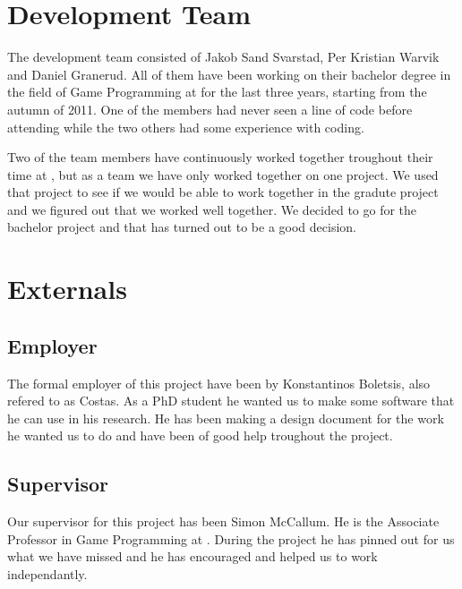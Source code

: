 \section{Development Team}
The development team consisted of Jakob Sand Svarstad, Per Kristian Warvik and Daniel Granerud.
All of them have been working on their bachelor degree in the field of Game Programming at \GUC{} for the last three years, starting from the autumn of 2011. One of the members had never seen a line of code before attending \GUC{} while the two others had some experience with coding.

Two of the team members have continuously worked together troughout their time at \GUC{}, but as a team we have only worked together on one project. We used that project to see if we would be able to work together in the gradute project and we figured out that we worked well together. We decided to go for the bachelor project and that has turned out to be a good decision.

\section{Externals}

\subsection{Employer}
The formal employer of this project have been \GUC{} by Konstantinos Boletsis, also refered to as Costas. As a PhD student he wanted us to make some software that he can use in his research. He has been making a design document for the work he wanted us to do and have been of good help troughout the project.

\subsection{Supervisor}
Our supervisor for this project has been Simon McCallum. He is the Associate Professor in Game Programming at \GUC{}. During the project he has pinned out for us what we have missed and he has encouraged and helped us to work independantly.



